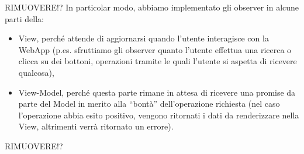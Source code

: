 RIMUOVERE!?
In particolar modo, abbiamo implementato gli observer in alcune parti della:
\begin{itemize}
\item View, perché attende di aggiornarsi quando l’utente interagisce con la WebApp (p.es. sfruttiamo gli observer quanto l'utente effettua una ricerca o clicca su dei bottoni, operazioni tramite le quali l'utente si aspetta di ricevere qualcosa),
\item View-Model, perché questa parte rimane in attesa di ricevere una promise da parte del Model in merito alla “bontà” dell’operazione richiesta (nel caso l’operazione abbia esito positivo, vengono ritornati i dati da renderizzare nella View, altrimenti verrà ritornato un errore).
\end{itemize}
RIMUOVERE!?

